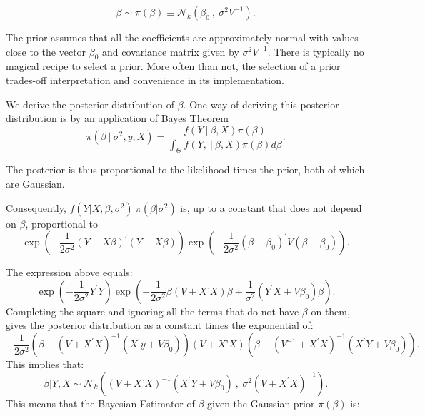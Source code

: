 \documentclass[11pt]{article} %
\begin{document}
\begin{equation}
\beta  \sim \pi (\beta) \equiv \mathcal{N}_{k}( \beta_0 \: , \: \sigma^2 V^{-1}).
\end{equation}

\noindent The prior assumes that all the coefficients are approximately normal with values close to the vector $\beta_0$ and covariance matrix given by $\sigma^2 V^{-1}$. There is typically no magical recipe to select a prior. More often than not, the selection of a prior trades-off interpretation and convenience in its implementation. 

We derive the posterior distribution of $\beta$. One way of deriving this posterior distribution is by an application of Bayes Theorem
\begin{equation*}
\pi(\beta \: | \: \sigma^2, y, X ) = \frac{f(Y  \: | \: \beta, X) \pi(\beta ) }{\int_{\Theta} f(Y, \: | \: \beta, X) \pi (\beta ) d \beta}. 
\end{equation*}

\noindent The posterior is thus proportional to the likelihood times the prior, both of which are Gaussian. 

\noindent Consequently, $f(Y | X, \beta, \sigma^2 )\:  \pi(\beta | \sigma^2 )$ is, up to a constant that does not depend on $\beta$, proportional to
\begin{equation} \label{equation:posterior}
\exp \left( -\frac{1}{2\sigma^2} (Y-X\beta)^{\prime} (Y-X \beta) \right)  \exp \left(-\frac{1}{2 \sigma^2} (\beta-\beta_0)^{\prime} V (\beta-\beta_0) \right). 
\end{equation}

\noindent The expression above equals:
\[ \exp \left( -\frac{1}{2\sigma^2} Y^{\prime} Y \right) \exp \left(  - \frac{1}{2 \sigma^2 } \beta \left(V + X’X \right) \beta + \frac{1}{\sigma^2}(Y^{\prime} X+V\beta_0) \beta \right). \]
Completing the square and ignoring all the terms that do not have $\beta$ on them, gives the posterior distribution as a constant times the exponential of:
\begin{equation*}
-\frac{1}{2 \sigma^2} \left( \beta -  \left( V + X^{\prime} X \right)^{-1} (X^{\prime} y+ V \beta_0) \right) \left(V+ X’X \right) \left(\beta -  ( V^{-1} + X^{\prime} X )^{-1} (X^{\prime} Y+ V \beta_0) \right). 
\end{equation*}
This implies that:
\begin{equation}
\beta | Y, X \sim \mathcal{N}_{k} \left(  \left( V + X’X \right)^{-1} (X^{\prime} Y+V\beta_0) \: , \:   \sigma^2 \left(V + X^{\prime} X \right)^{-1}   \right).
\end{equation}
This means that the Bayesian Estimator of $\beta$ given the Gaussian prior $\pi(\beta)$ is:
\end{document}
